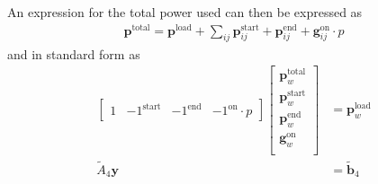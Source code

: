 An expression for the total power used can then be expressed as
\begin{equation}
	\begin{aligned}
		\mathbf{p}^{\text{total}} = \mathbf{p}^{\text{load}} + \sum_{ij} \mathbf{p}^{\text{start}}_{ij} + \mathbf{p}^{\text{end}}_{ij} + \mathbf{g}^{\text{on}}_{ij}\cdot p
	\end{aligned}
\end{equation}
and in standard form as
\begin{equation} \begin{aligned}
	\begin{bmatrix}
		1 & -1^{\text{start}} & -1^{\text{end}} & -1^{\text{on}}\cdot p  
	\end{bmatrix}
	\begin{bmatrix}
		\mathbf{p}_{w}^{\text{total}} \\
	        \mathbf{p}_{w}^{\text{start}} \\
	        \mathbf{p}_{w}^{\text{end}}   \\
	        \mathbf{g}_{w}^{\text{on}}    \\
	\end{bmatrix} &= \mathbf{p}_{w}^{\text{load}}  \\
	\tilde{A}_4\mathbf{y} &= \tilde{\mathbf{b}}_4
\end{aligned} \end{equation}

